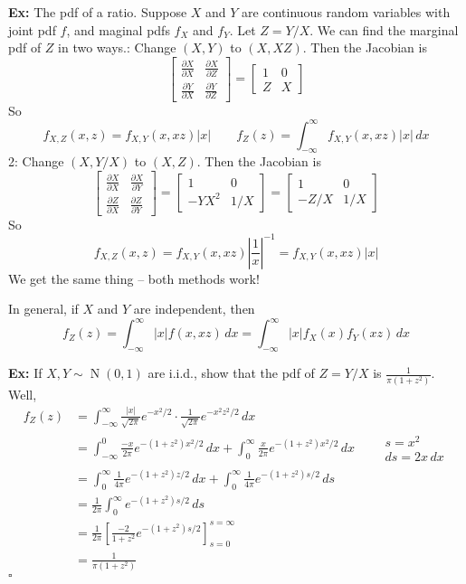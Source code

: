 \documentclass[10pt,letterpaper]{article}
\newcommand{\n}{\hfill\break}
\newcommand{\nn}{\vspace{0.5\baselineskip}\n}
\newcommand{\hangblock}[2]{\par\noindent\settowidth{\hangindent}{\textbf{#1: }}\textbf{#1: }\nolinebreak#2}
\newcommand{\ex}[1]{\hangblock{Ex}{#1}}
\newcommand{\proven}{\;$\square$\n}
\DeclareMathOperator{\Normal}{N}
\newcommand{\inv}{^{-1}}
\newcommand{\abs}[1]{\left|#1\right|}
\newcommand{\pd}[2]{\frac{\partial{}#1}{\partial{}#2}}
\renewcommand{\brack}[1]{\left[#1\right]}
\begin{document}
\ex{
	The pdf of a ratio. Suppose $X$ and $Y$ are continuous random variables with joint pdf $f$, and maginal pdfs $f_{X}$ and $f_{Y}$. Let $Z=Y/X$. We can find the marginal pdf of $Z$ in two ways.\nn
	1: Change $(X,Y)$ to $(X,XZ)$. Then the Jacobian is
	\[
		\begin{bmatrix}
			\pd{X}{X} & \pd{X}{Z}\\
			\pd{Y}{X} & \pd{Y}{Z}
		\end{bmatrix}=\begin{bmatrix}
			1 & 0\\
			Z & X
		\end{bmatrix}
	\]
	So
	\[
		f_{X,Z}(x,z)=f_{X,Y}(x,xz)\abs{x}\qquad{}f_{Z}(z)=\int_{-\infty}^{\infty}f_{X,Y}(x,xz)\abs{x}\,dx
	\]
	2: Change $(X,Y/X)$ to $(X,Z)$. Then the Jacobian is
	\[
		\begin{bmatrix}
			\pd{X}{X} & \pd{X}{Y}\\
			\pd{Z}{X} & \pd{Z}{Y}
		\end{bmatrix}=\begin{bmatrix}
			1 & 0\\
			-YX^{2} & 1/X
		\end{bmatrix}=\begin{bmatrix}
			1 & 0\\
			-Z/X & 1/X
		\end{bmatrix}
	\]
	So
	\[
		f_{X,Z}(x,z)=f_{X,Y}(x,xz)\abs{\frac{1}{x}}\inv=f_{X,Y}(x,xz)\abs{x}
	\]
	We get the same thing -- both methods work!\n
}

\par\noindent
In general, if $X$ and $Y$ are independent, then
\[
	f_{Z}(z)=\int_{-\infty}^{\infty}\abs{x}f(x,xz)\,dx=\int_{-\infty}^{\infty}\abs{x}f_{X}(x)f_{Y}(xz)\,dx
\]

\ex{
	If $X,Y\sim\Normal(0,1)$ are i.i.d., show that the pdf of $Z=Y/X$ is $\frac{1}{\pi(1+z^{2})}$. Well,
	\begin{align*}
		f_{Z}(z) & =\int_{-\infty}^{\infty}\frac{\abs{x}}{\sqrt{2\pi}}e^{-x^{2}/2}\cdot\frac{1}{\sqrt{2\pi}}e^{-x^{2}z^{2}/2}\,dx\\
		& =\int_{-\infty}^{0}\frac{-x}{2\pi}e^{-(1+z^{2})x^{2}/2}\,dx+\int_{0}^{\infty}\frac{x}{2\pi}e^{-(1+z^{2})x^{2}/2}\,dx\qquad\begin{smallmatrix}s=x^{2}\\ ds=2x\,dx\end{smallmatrix}\\
		& =\int_{0}^{\infty}\frac{1}{4\pi}e^{-(1+z^{2})z/2}\,dx+\int_{0}^{\infty}\frac{1}{4\pi}e^{-(1+z^{2})s/2}\,ds\\
		& =\frac{1}{2\pi}\int_{0}^{\infty}e^{-(1+z^{2})s/2}\,ds\\
		& =\frac{1}{2\pi}\brack{\frac{-2}{1+z^{2}}e^{-(1+z^{2})s/2}}_{s=0}^{s=\infty}\\
		& =\frac{1}{\pi(1+z^{2})}
	\end{align*}
	\proven
}
\end{document}
